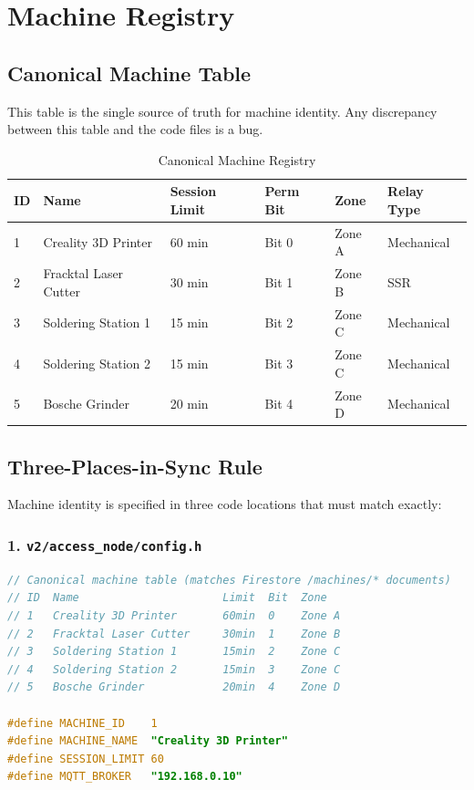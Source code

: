 \chapter{Machine Registry}
\label{app:machine_registry}

\section{Canonical Machine Table}

This table is the single source of truth for machine identity. Any discrepancy between this table and the code files is a bug.

\begin{table}[H]
\centering
\caption{Canonical Machine Registry}
\begin{tabular}{C{1.5cm}L{4.5cm}C{2.5cm}C{2.5cm}C{2cm}C{2cm}}
\toprule
\textbf{ID} & \textbf{Name} & \textbf{Session Limit} & \textbf{Perm Bit} & \textbf{Zone} & \textbf{Relay Type} \\
 & Creality 3D Printer   & 60 min & Bit 0 & Zone A & Mechanical \\
2 & Fracktal Laser Cutter & 30 min & Bit 1 & Zone B & SSR \\
3 & Soldering Station 1   & 15 min & Bit 2 & Zone C & Mechanical \\
4 & Soldering Station 2   & 15 min & Bit 3 & Zone C & Mechanical \\
5 & Bosche Grinder        & 20 min & Bit 4 & Zone D & Mechanical \\
\bottomrule
\end{tabular}
\end{table}

\section{Three-Places-in-Sync Rule}

Machine identity is specified in three code locations that must match exactly:

\subsection{1. \texttt{v2/access\_node/config.h}}
\begin{lstlisting}[language=C,caption={Machine identity in firmware config}]
// Canonical machine table (matches Firestore /machines/* documents)
// ID  Name                      Limit  Bit  Zone
// 1   Creality 3D Printer       60min  0    Zone A
// 2   Fracktal Laser Cutter     30min  1    Zone B
// 3   Soldering Station 1       15min  2    Zone C
// 4   Soldering Station 2       15min  3    Zone C
// 5   Bosche Grinder            20min  4    Zone D

#define MACHINE_ID    1
#define MACHINE_NAME  "Creality 3D Printer"
#define SESSION_LIMIT 60
#define MQTT_BROKER   "192.168.0.10"
\end{lstlisting}

